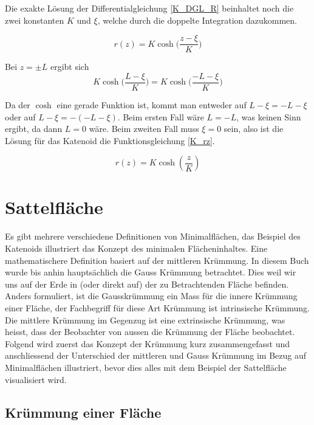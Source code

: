 \begin{refsection}
Die exakte Lösung der Differentialgleichung \eqref{K_DGL_R} beinhaltet noch die zwei konstanten $K$ und $\xi$, welche durch die doppelte Integration dazukommen.

\begin{equation} \label{K_r}
r(z)=K \cosh\bigg(\frac{z-\xi}{K}\bigg)
\end{equation}

Bei $z= \pm L$ ergibt sich 
\begin{equation} \label{K_rL}
K \cosh\bigg(\frac{L-\xi}{K}\bigg)=K \cosh\bigg(\frac{-L-\xi}{K}\bigg)
\end{equation}

Da der $\cosh$ eine gerade Funktion ist, kommt man entweder auf $L-\xi=-L-\xi$ oder auf $L-\xi=-(-L-\xi)$.
Beim ersten Fall wäre $L=-L$, was keinen Sinn ergibt, da dann $L=0$ wäre. Beim zweiten Fall muss $\xi=0$ sein, also ist die Lösung für das Katenoid die Funktionsgleichung \eqref{K_rz}.

\begin{equation} \label{K_rz}
r(z)=K \cosh\left(\frac{z}{K}\right)
\end{equation}

\section{Sattelfläche}
Es gibt mehrere verschiedene Definitionen von Minimalflächen, das Beispiel des Katenoids illustriert das Konzept des minimalen Flächeninhaltes. 
Eine mathematischere Definition basiert auf der mittleren Krümmung. 
In diesem Buch wurde bis anhin hauptsächlich die Gauss Krümmung betrachtet. 
Dies weil wir uns auf der Erde in (oder direkt auf) der zu Betrachtenden Fläche befinden. 
Anders formuliert, ist die Gausskrümmung ein Mass für die innere Krümmung einer Fläche, der Fachbegriff für diese Art Krümmung ist intrinsische Krümmung. 
Die mittlere Krümmung im Gegenzug ist eine extrinsische Krümmung, was heisst, dass der Beobachter von aussen die Krümmung der Fläche beobachtet.
Folgend wird zuerst das Konzept der Krümmung kurz zusammengefasst und anschliessend der Unterschied der mittleren und Gauss Krümmung im Bezug auf Minimalflächen illustriert, bevor dies alles mit dem Beispiel der Sattelfläche visualisiert wird.


\subsection{Krümmung einer Fläche}


\end{refsection}
